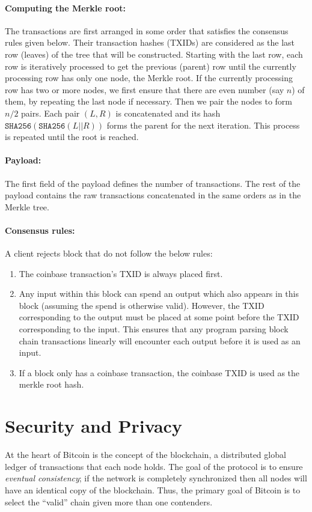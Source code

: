 \documentclass[]{report}   %
\begin{document}
\paragraph{Computing the Merkle root:} The transactions are first arranged in some order that satisfies the consensus rules given below. Their transaction hashes (TXIDs) are considered as the last row (leaves) of the tree that will be constructed. Starting with the last row, each row is iteratively processed to get the previous (parent) row until the currently processing row has only one node, the Merkle root. 
If the currently processing row has two or more nodes, we first ensure that there are even number (say $n$) of them, by repeating the last node if necessary. Then we pair the nodes to form $n/2$ pairs. Each pair $(L, R)$ is concatenated and its hash $\texttt{SHA256}(\texttt{SHA256}(L||R))$ forms the parent for the next iteration. This process is repeated until the root is reached. 


\paragraph{Payload:} The first field of the payload defines the number of transactions. The rest of the payload contains the raw transactions concatenated in the same orders as in the Merkle tree.


\paragraph{Consensus rules:} A client rejects block that do not follow the below rules:
\begin{enumerate}
	\item The coinbase transaction's TXID is always placed first.
	\item Any input within this block can spend an output which also appears in this block (assuming the spend is otherwise valid). However, the TXID corresponding to the output must be placed at some point before the TXID corresponding to the input. This ensures that any program parsing block chain transactions linearly will encounter each output before it is used as an input.
\item If a block only has a coinbase transaction, the coinbase TXID is used as the merkle root hash.
\end{enumerate}





\section{Security and Privacy} 
\label{btc-security}
At the heart of Bitcoin is the concept of the blockchain, a distributed global ledger of transactions that each node holds. The goal of the protocol is to ensure {\em eventual consistency}; if the network is completely synchronized then all nodes will have an identical copy of the blockchain. Thus, the primary goal of Bitcoin is to select the ``valid'' chain given more than one contenders. 
\end{document}
